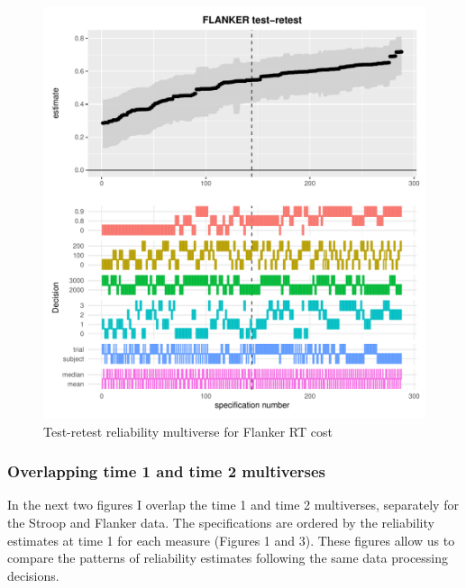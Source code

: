 \documentclass[
  man,floatsintext]{apa6}
\begin{document}
\begin{figure}
\centering
\includegraphics{Reliability_Multiverse_files/figure-latex/unnamed-chunk-10-1.pdf}
\caption{\label{fig:unnamed-chunk-10}Test-retest reliability multiverse for Flanker RT cost}
\end{figure}

\newpage

\hypertarget{overlapping-time-1-and-time-2-multiverses}{%
\subsubsection{Overlapping time 1 and time 2 multiverses}\label{overlapping-time-1-and-time-2-multiverses}}

In the next two figures I overlap the time 1 and time 2 multiverses, separately for the Stroop and Flanker data. The specifications are ordered by the reliability estimates at time 1 for each measure (Figures 1 and 3). These figures allow us to compare the patterns of reliability estimates following the same data processing decisions.
\end{document}
